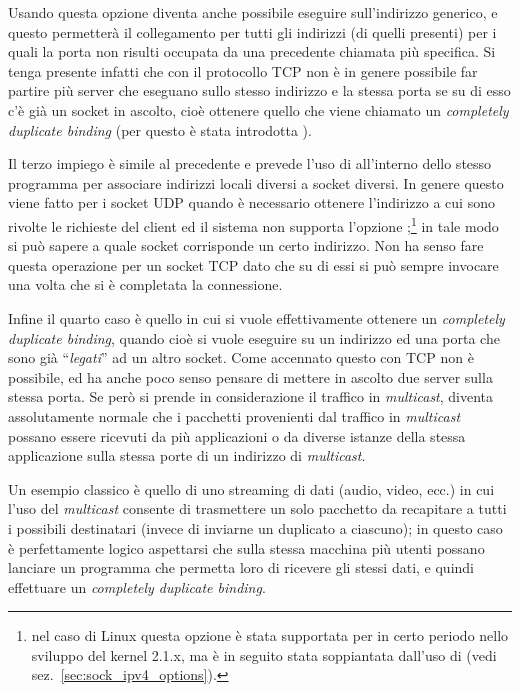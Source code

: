 Usando questa opzione diventa anche possibile eseguire 
sull'indirizzo generico, e questo permetterà il collegamento per tutti gli
indirizzi (di quelli presenti) per i quali la porta non risulti occupata da
una precedente chiamata più specifica. Si tenga presente infatti che con il
protocollo TCP non è in genere possibile far partire più server che eseguano
 sullo stesso indirizzo e la stessa porta se su di esso c'è già un
socket in ascolto, cioè ottenere quello che viene chiamato un
 \textit{completely duplicate binding}
(per questo è stata introdotta ).

Il terzo impiego è simile al precedente e prevede l'uso di 
all'interno dello stesso programma per associare indirizzi locali diversi a
socket diversi. In genere questo viene fatto per i socket UDP quando è
necessario ottenere l'indirizzo a cui sono rivolte le richieste del client ed
il sistema non supporta l'opzione ;\footnote{nel caso
  di Linux questa opzione è stata supportata per in certo periodo nello
  sviluppo del kernel 2.1.x, ma è in seguito stata soppiantata dall'uso di
   (vedi sez.~\ref{sec:sock_ipv4_options}).} in tale modo
si può sapere a quale socket corrisponde un certo indirizzo.  Non ha senso
fare questa operazione per un socket TCP dato che su di essi si può sempre
invocare  una volta che si è completata la connessione.

Infine il quarto caso è quello in cui si vuole effettivamente ottenere un
\textit{completely duplicate binding}, quando cioè si vuole eseguire
 su un indirizzo ed una porta che sono già ``\textsl{legati}'' ad
un altro socket.  Come accennato questo con TCP non è possibile, ed ha anche
poco senso pensare di mettere in ascolto due server sulla stessa porta. Se
però si prende in considerazione il traffico in \textit{multicast}, diventa
assolutamente normale che i pacchetti provenienti dal traffico in
\textit{multicast} possano essere ricevuti da più applicazioni o da diverse
istanze della stessa applicazione sulla stessa porte di un indirizzo di
\textit{multicast}.

Un esempio classico è quello di uno streaming di dati (audio, video, ecc.) in
cui l'uso del \textit{multicast} consente di trasmettere un solo pacchetto da
recapitare a tutti i possibili destinatari (invece di inviarne un duplicato a
ciascuno); in questo caso è perfettamente logico aspettarsi che sulla stessa
macchina più utenti possano lanciare un programma che permetta loro di
ricevere gli stessi dati, e quindi effettuare un \textit{completely duplicate
  binding}.

